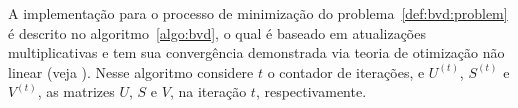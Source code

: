 \documentclass[
    12pt,                %
    oneside,            %
    a4paper,            %
    english,            %
    brazil                %
    ]{abntex2ppgsi}
\begin{document}
%
%
%
%

A implementação para o processo de minimização do problema~\ref{def:bvd:problem} é descrito no algoritmo~\ref{algo:bvd}, o qual é baseado em atualizações multiplicativas e tem sua convergência demonstrada via teoria de otimização não linear (veja ).
Nesse algoritmo considere $t$ o contador de iterações, e $U^{(t)}$, $S^{(t)}$ e $V^{(t)}$, as matrizes $U$, $S$ e $V$, na iteração $t$, respectivamente.

\end{document}
